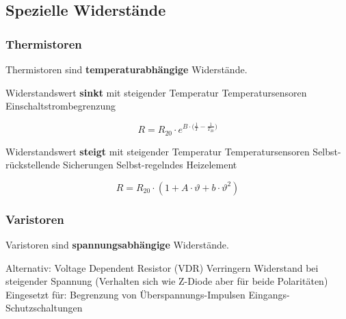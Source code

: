 \subsection{Spezielle Widerstände}


\subsubsection{Thermistoren}

Thermistoren sind \textbf{temperaturabhängige} Widerstände.

\begin{minipage}[c]{0.48\columnwidth}

    \begin{outline}
        \1 Widerstandswert \textbf{sinkt} mit steigender Temperatur
            \2 Temperatursensoren
            \2 Einschaltstrombegrenzung
    \end{outline}

    $$ \boxed{ R = R_{20} \cdot e^{B \cdot \Big( \frac{1}{T} - \frac{1}{T_{20}} \Big)} } $$
\end{minipage}
\hfill
\begin{minipage}[c]{0.48\columnwidth}

    \begin{outline}
        \1 Widerstandswert \textbf{steigt} mit steigender Temperatur
            \2 Temperatursensoren
            \2 Selbst-rückstellende Sicherungen
            \2 Selbst-regelndes Heizelement
    \end{outline}

    $$ \boxed{ R = R_{20} \cdot ( 1 + A \cdot \vartheta + b \cdot \vartheta^2) } $$
\end{minipage}


\subsubsection{Varistoren}

Varistoren sind \textbf{spannungsabhängige} Widerstände.

\begin{outline}
    \1 Alternativ: Voltage Dependent Resistor (VDR)
    \1 Verringern Widerstand bei steigender Spannung (Verhalten sich wie Z-Diode aber für beide Polaritäten)
    \1 Eingesetzt für:
        \2 Begrenzung von Überspannungs-Impulsen
        \2 Eingangs-Schutzschaltungen
\end{outline}    


